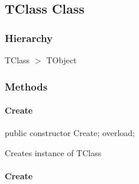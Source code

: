 \documentclass{report}
\newif\ifpdf
\begin{document}
\subsection*{TClass Class}
\fi
\label{ok_parse_impl.TClass}
\subsubsection*{\large{\textbf{Hierarchy}}\normalsize\hspace{1ex}\hfill}
TClass {$>$} TObject
\subsubsection*{\large{\textbf{Methods}}\normalsize\hspace{1ex}\hfill}
\paragraph*{Create}\hspace*{\fill}

\label{ok_parse_impl.TClass-Create}
\begin{list}{}{
\setlength{\itemindent}{0cm}
\setlength{\listparindent}{0cm}
\setlength{\leftmargin}{\evensidemargin}
\addtolength{\leftmargin}{\tmplength}
\settowidth{\labelsep}{X}
\addtolength{\leftmargin}{\labelsep}
\setlength{\labelwidth}{\tmplength}
}
\item[\textbf{Declaration}\hfill]
\ifpdf
\begin{flushleft}
\fi
\begin{ttfamily}
public constructor Create; overload;\end{ttfamily}

\ifpdf
\end{flushleft}
\fi

\par
\item[\textbf{Description}]
Creates instance of TClass

\end{list}
\paragraph*{Create}\hspace*{\fill}
\end{document}
